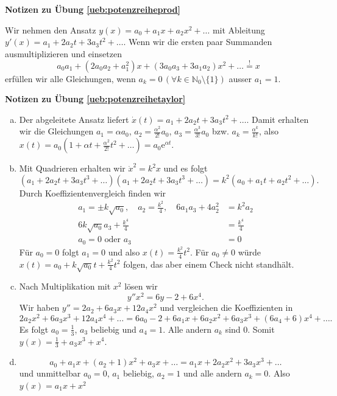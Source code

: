 \documentclass[%
11pt,%
twoside,%
titlepage,%
swissgerman,%
headsepline%
]{scrartcl}
\newcommand{\faReturnGray}{\textcolor{gray}{\faMailReply}} %
\theoremstyle{definition}
\theoremstyle{plain}
\newcommand{\concatueb}[1]{ueb:#1}%
\newcommand{\concatlsg}[1]{lsg:#1}%
\newenvironment{lsg}[1]{%
    \par\noindent\textbf{Notizen zu Übung \ref{\concatueb{#1}}}\label{\concatlsg{#1}}
    \hfill\hyperref[\concatueb{#1}]{\faReturnGray}\par %
}{%
    \par%
}
\begin{document}
\begin{lsg}{potenzreiheprod}
    Wir nehmen den Ansatz $y(x)=a_0+a_1x+a_2x^2+\dots$ mit Ableitung $y'(x)=a_1+2a_2t+3a_3t^2+\dots$. Wenn wir die ersten paar Summanden ausmultiplizieren und einsetzen
    $$a_0a_1+(2a_0a_2+a_1^2)x+(3a_0a_3+3a_1a_2)x^2+\dots\stackrel{!}{=}x$$
    erfüllen wir alle Gleichungen, wenn $a_k=0\,(\forall k\in\mathbb{N}_0\setminus\{1\})$ ausser $a_1=1$.
\end{lsg}
\begin{lsg}{potenzreihetaylor}
    \begin{enumerate}[a)]
        \item Der abgeleitete Ansatz liefert $\dot{x}(t)=a_1+2a_2t+3a_3t^2+\dots$. Damit erhalten wir die Gleichungen $a_1=\alpha a_0$, $a_2=\frac{\alpha^2}{2!}a_0$, $a_3=\frac{\alpha^3}{3!}a_0$ bzw. $a_k=\frac{\alpha^k}{k!}$, also $x(t)=a_0(1+\alpha t+\frac{\alpha^2}{2!}t^2+\dots)=a_0\mathrm{e}^{\alpha t}$.
        \item Mit Quadrieren erhalten wir $\dot{x}^2=k^2x$ und es folgt
        $$(a_1+2a_2t+3a_3t^3+\dots)(a_1+2a_2t+3a_3t^3+\dots)=k^2(a_0+a_1t+a_2t^2+\dots).$$
        Durch Koeffizientenvergleich finden wir
        \begin{align*}
            a_1=\pm k\sqrt{a_0},\quad a_2=\frac{k^2}{4},\quad 6a_1a_3+4a_2^2 &= k^2a_2\\
            6k\sqrt{a_0}a_3+\frac{k^4}{4} &= \frac{k^4}{4}\\
            a_0=0\text{ oder } a_3 &= 0
        \end{align*}
        Für $a_0=0$ folgt $a_1=0$ und also $x(t)=\frac{k^2}{4}t^2$. Für $a_0\neq0$ würde $x(t)=a_0+k\sqrt{a_0}t+\frac{k^2}{4}t^2$ folgen, das aber einem Check nicht standhält.
        \item Nach Multiplikation mit $x^2$ lösen wir
        $$y''x^2=6y-2+6x^4.$$
        Wir haben $y''=2a_2+6a_3x+12a_4x^2$ und vergleichen die Koeffizienten in
        $$2a_2x^2+6a_3x^3+12a_4x^4+\dots=6a_0-2+6a_1x+6a_2x^2+6a_3x^3+(6a_4+6)x^4+\dots.$$
        Es folgt $a_0=\frac{1}{3}$, $a_3$ beliebig und $a_4=1$. Alle andern $a_k$ sind $0$. Somit $y(x)=\frac{1}{3}+a_3x^3+x^4$.
        \item $$a_0+a_1x+(a_2+1)x^2+a_3x+\dots=a_1x+2a_2x^2+3a_3x^3+\dots$$
        und unmittelbar $a_0=0$, $a_1$ beliebig, $a_2=1$ und alle andern $a_k=0$. Also $y(x)=a_1x+x^2$
    \end{enumerate}
\end{lsg}

\clearpage
\end{document}
